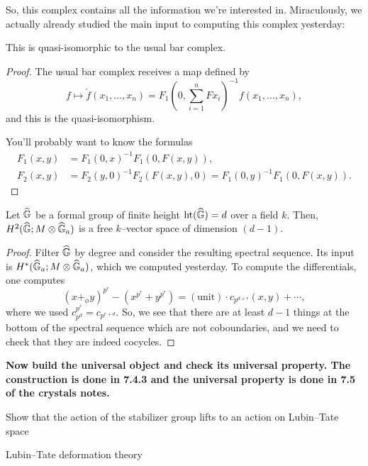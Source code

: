 So, this complex contains all the information we're interested in.  Miraculously, we actually already studied the main input to computing this complex yesterday:

\begin{lemma}
This is quasi-isomorphic to the usual bar complex.
\end{lemma}
\begin{proof}
The usual bar complex receives a map defined by \[f \mapsto \check{f}(x_1, \ldots, x_n) = F_1\left( 0, \sum_{i=1}^n {}F x_i \right)^{-1} f(x_1, \ldots, x_n),\] and this is the quasi-isomorphism.

You'll probably want to know the formulas
\begin{align*}
F_1(x, y) & = F_1(0, x)^{-1} F_1(0, F(x, y)), \\
F_2(x, y) & = F_2(y, 0)^{-1} F_2(F(x, y), 0) = F_1(0, y)^{-1} F_1(0, F(x, y)).
\end{align*}
\end{proof}

\begin{lemma}
Let $\widehat{\mathbb G}$ be a formal group of finite height $\operatorname{ht}(\widehat{\mathbb G}) = d$ over a field $k$.  Then, $H^2(\widehat{\mathbb G}; M \otimes \widehat{\mathbb G}_a)$ is a free $k$--vector space of dimension $(d - 1)$.
\end{lemma}
\begin{proof}
Filter $\widehat{\mathbb G}$ by degree and consider the resulting spectral sequence.  Its input is $H^*(\widehat{\mathbb G}_a; M \otimes \widehat{\mathbb G}_a)$, which we computed yesterday.  To compute the differentials, one computes \[(x +_\phi y)^{p^r} - (x^{p^r} + y^{p^r}) = (\text{unit}) \cdot c_{p^{d + r}}(x, y) + \cdots,\] where we used $c_{p^d}^{p^r} = c_{p^{r+d}}$.  So, we see that there are at least $d - 1$ things at the bottom of the spectral sequence which are not coboundaries, and we need to check that they are indeed cocycles.
\end{proof}

\textbf{Now build the universal object and check its universal property.  The construction is done in 7.4.3 and the universal property is done in 7.5 of the crystals notes.}



Show that the action of the stabilizer group lifts to an action on Lubin--Tate space

Lubin--Tate deformation theory









